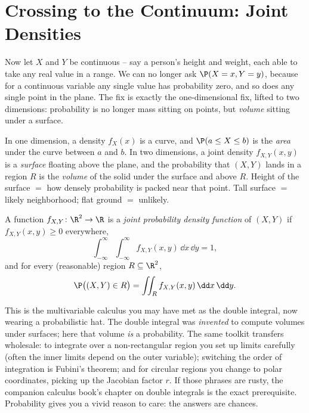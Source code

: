 \section{Crossing to the Continuum: Joint Densities}
\label{ch13:joint-pdf}

Now let $X$ and $Y$ be continuous -- say a person's height and weight, each able
to take any real value in a range. We can no longer ask $\P(X=x, Y=y)$, because
for a continuous variable any single value has probability zero, and so does any
single point in the plane. The fix is exactly the one-dimensional fix, lifted to
two dimensions: probability is no longer mass sitting on points, but
\emph{volume} sitting under a surface.

\begin{intuitionbox}
In one dimension, a density $f_X(x)$ is a curve, and $\P(a\le X\le b)$ is the
\emph{area} under the curve between $a$ and $b$. In two dimensions, a joint
density $f_{X,Y}(x,y)$ is a \emph{surface} floating above the plane, and the
probability that $(X,Y)$ lands in a region $R$ is the \emph{volume} of the solid
under the surface and above $R$. Height of the surface $=$ how densely probability
is packed near that point. Tall surface $=$ likely neighborhood; flat ground
$=$ unlikely.
\end{intuitionbox}

\begin{definition}
\label{ch13:def-joint-pdf}
A function $f_{X,Y}\colon \R^2 \to \R$ is a \emph{joint probability density
function} of $(X,Y)$ if $f_{X,Y}(x,y)\ge 0$ everywhere,
\[
  \int_{-\infty}^{\infty}\!\!\int_{-\infty}^{\infty} f_{X,Y}(x,y)\,\dd x\,\dd y = 1,
\]
and for every (reasonable) region $R \subseteq \R^2$,
\[
  \P\big((X,Y)\in R\big) = \iint_{R} f_{X,Y}(x,y)\,\dd x\,\dd y .
\]
\end{definition}

\begin{connectionbox}
This is the multivariable calculus you may have met as the double integral, now
wearing a probabilistic hat. The double integral was \emph{invented} to compute
volumes under surfaces; here that volume \emph{is} a probability. The same
toolkit transfers wholesale: to integrate over a non-rectangular region you set
up limits carefully (often the inner limits depend on the outer variable);
switching the order of integration is Fubini's theorem; and for circular regions
you change to polar coordinates, picking up the Jacobian factor $r$. If those
phrases are rusty, the companion calculus book's chapter on double integrals is
the exact prerequisite. Probability gives you a vivid reason to care: the answers
are chances.
\end{connectionbox}

